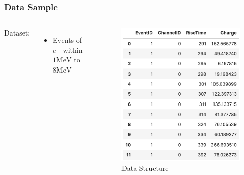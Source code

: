 \documentclass[handout]{beamer}
\newcommand{\mev}{\mathrm{MeV}}
\begin{document}
\begin{frame}
\frametitle{Data Sample}
\begin{columns}
\hspace{4mm}Dataset:
\begin{itemize}
    \item Events of $e^{-}$ within $1\mev$ to $8\mev$
\end{itemize}
\begin{figure}
    \centering
    \caption{Data Structure}
    \includegraphics[width=1.0\linewidth]{img/dataset.png}
\end{figure}
\end{columns}
\end{frame}
\end{document}
